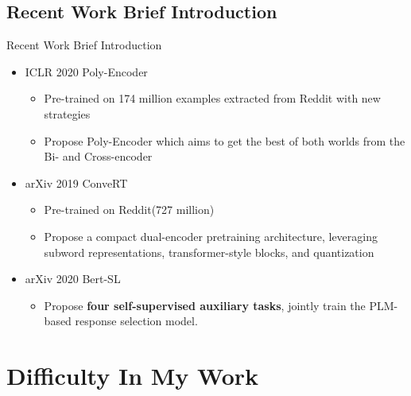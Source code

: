 \documentclass{beamer}
\begin{document}
\subsection{Recent Work Brief Introduction}
\begin{frame}{Recent Work Brief Introduction}
    \begin{itemize}
        \item ICLR 2020 Poly-Encoder 
            \begin{itemize}
                \item Pre-trained on 174 million examples extracted from Reddit with new strategies
                \item Propose Poly-Encoder which aims to get the best of both worlds from the Bi- and Cross-encoder
            \end{itemize}
        \item arXiv 2019 ConveRT
        \begin{itemize}
            \item Pre-trained on Reddit(727 million)
            \item Propose a compact dual-encoder pretraining architecture, leveraging subword representations, transformer-style blocks, and quantization
        \end{itemize}
        \item arXiv 2020 Bert-SL
        \begin{itemize}
            \item Propose \textbf{four self-supervised auxiliary tasks}, jointly train the PLM-based response selection model.
        \end{itemize}
    \end{itemize}
\end{frame}

\section{Difficulty In My Work}



\end{document}
